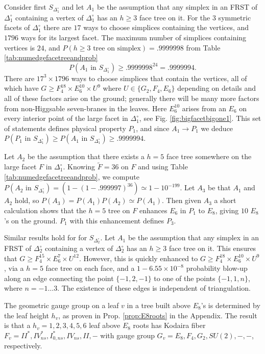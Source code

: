 \documentclass[aps,prl,twocolumn, superscriptaddress,groupedaddress,nofootinbib]{revtex4-1}
\newcommand{\sdoc}{S_{\Delta_1^\circ}}
\newcommand{\sdtc}{S_{\Delta_2^\circ}}
\newcommand{\doc}{{\Delta_1^\circ}}
\newcommand{\dtc}{{\Delta_2^\circ}}
\newcommand{\textin}{\,\, \text{in} \,\,}
\begin{document}
Consider first $\sdoc$ and let $A_1$ be the assumption that any simplex in an FRST 
of $\doc$ containing a vertex of $\doc$ has an $h\geq 3$ face tree on it. 
For the $3$ symmetric facets of $\doc$ there are $17$ ways to choose simplices
containing the vertices, and $1796$ ways for its largest facet. The maximum
number of simplices containing vertices is $24$, and $P(h\geq 3 \,\, \text{tree on simplex}) = .9999998$ from Table \ref{tab:numedgefacetreeandprob}
\begin{equation}
P(A_1\textin\sdoc)\geq .9999998^{24}=.9999994.
\end{equation}
There are $17^3\times1796$ ways to choose simplices that contain the vertices,
all of which have $G\geq F_4^{18}\times E_6^{10}\times U^9$ where 
$U\in\{G_2,F_4,E_6\}$ depending on details and all of these factors arise on
the ground; generally there will be many more factors from non-Higgsable seven-branes
in the leaves. Here $E_6^{10}$ arises from an $E_6$ on every interior point
of the large facet in $\doc$, see Fig. \ref{fig:bigfacetbigone1}. This set of
statements defines physical property $P_1$, and since $A_1\to P_1$
we deduce $P(P_1\textin \sdoc)\geq P(A_1\textin \sdoc) \geq .9999994$.

Let $A_2$ be the assumption that there exists a $h=5$ face tree somewhere
on the large facet $F$ in $\doc$. Knowing $\tilde F=36$ on $F$ and using
Table \ref{tab:numedgefacetreeandprob}, we compute $P(A_2 \textin \sdoc)=(1-(1-.999997)^{36})\simeq 1-10^{-199}.$ Let $A_3$ be that $A_1$ and $A_2$ hold, so 
$P(A_3)=P(A_1)P(A_2)\simeq P(A_1)$. Then given $A_3$ a short calculation shows 
that the  $h=5$ tree on $F$ 
enhances $E_6$ in $P_1$ to $E_8$, giving $10$ $E_8$'s on the ground. $P_1$ with this enhancement defines $P_3$. 

Similar results hold for for $\sdtc$. Let $A_1$ be the assumption that any simplex in an FRST 
of $\dtc$ containing a vertex of $\dtc$ has an $h\geq 3$ face tree on it. This ensures that $G\geq F_4^{15}\times E_6^{7}\times U^{12}$. However, this is quickly enhanced to  $G\geq F_4^{18}\times E_6^{10}\times U^9$, via a $h=5$ face tree on each face, and a $1-6.55\times 10^{-8}$ probability blow-up along an edge connecting the point $\{-1, 2, -1\}$ to one of the points $\{-1, 1, n\}$, where $n = -1\dots 3$. The existence of these edges is independent of triangulation.

The  geometric gauge group on a leaf $v$ in a tree built above $E_8$'s
is determined by the leaf height $h_v$, as proven in Prop. \ref{prop:E8roots} in the Appendix. 
The result is that a $h_v=1,2,3,4,5,6$ leaf
above $E_8$ roots has Kodaira fiber $F_v=II^*,IV^*_{ns},I^*_{0,ns},IV_{ns},II,-$
with gauge group $G_v=E_8,F_4,G_2,SU(2),-,-$, respectively.
\end{document}
